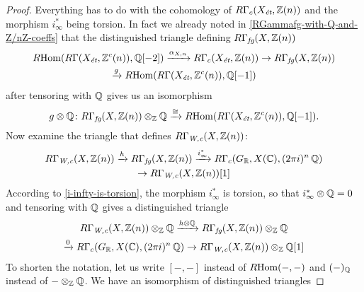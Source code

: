 \begin{proposition}
  \begin{proof}
    Everything has to do with the cohomology of
    $R\Gamma_c (X_\text{\it ét}, \mathbb{Z} (n))$ and the morphism $i_\infty^*$ being
    torsion. In fact we already noted in \ref{RGammafg-with-Q-and-Z/nZ-coeffs}
    that the distinguished triangle defining
    $R\Gamma_\text{\it fg} (X, \mathbb{Z} (n))$
    \begin{multline*}
      R\!\operatorname{Hom} (R\Gamma (X_\text{\it ét}, \mathbb{Z}^c (n)), \mathbb{Q} [-2])
      \xrightarrow{\alpha_{X,n}} R\Gamma_c (X_\text{\it ét}, \mathbb{Z} (n)) \to
      R\Gamma_\text{\it fg} (X, \mathbb{Z} (n)) \\
      \xrightarrow{g} R\!\operatorname{Hom} (R\Gamma (X_\text{\it ét}, \mathbb{Z}^c (n)), \mathbb{Q} [-1])
    \end{multline*}
    after tensoring with $\mathbb{Q}$ gives us an isomorphism
    \[ g\otimes\mathbb{Q}\colon
      R\Gamma_\text{\it fg} (X, \mathbb{Z} (n))\otimes_{\mathbb{Z}}\mathbb{Q} \xrightarrow{\cong}
      R\!\operatorname{Hom} (R\Gamma (X_\text{\it ét}, \mathbb{Z}^c (n)), \mathbb{Q} [-1]).\]
    Now examine the triangle that defines $R\Gamma_\text{\it W,c} (X, \mathbb{Z} (n))$:
    \begin{multline*}
      R\Gamma_\text{\it W,c} (X, \mathbb{Z} (n)) \xrightarrow{h}
      R\Gamma_\text{\it fg} (X, \mathbb{Z} (n)) \xrightarrow{i_\infty^*}
      R\Gamma_c (G_{\mathbb{R}}, X (\mathbb{C}), (2\pi i)^n\,\mathbb{Q}) \\
      \to R\Gamma_\text{\it W,c} (X, \mathbb{Z} (n)) [1]
    \end{multline*}
    According to \ref{i-infty-is-torsion}, the morphism $i_\infty^*$ is torsion,
    so that $i_\infty^*\otimes \mathbb{Q} = 0$ and tensoring with $\mathbb{Q}$ gives a
    distinguished triangle
    \begin{multline*}
      R\Gamma_\text{\it W,c} (X, \mathbb{Z} (n))\otimes_{\mathbb{Z}}\mathbb{Q}
      \xrightarrow{h\otimes\mathbb{Q}}
      R\Gamma_\text{\it fg} (X, \mathbb{Z} (n))\otimes_{\mathbb{Z}}\mathbb{Q} \\
      \xrightarrow{0} R\Gamma_c (G_{\mathbb{R}}, X (\mathbb{C}), (2\pi i)^n\,\mathbb{Q}) \to
      R\Gamma_\text{\it W,c} (X, \mathbb{Z} (n))\otimes_{\mathbb{Z}}\mathbb{Q} [1]
    \end{multline*}
    To shorten the notation, let us write $[-, -]$ instead of $R\!\operatorname{Hom} (-, -)$ and
    $(-)_{\mathbb{Q}}$ instead of $-\otimes_{\mathbb{Z}} \mathbb{Q}$. We have an isomorphism of
    distinguished triangles


\end{proof}
\end{proposition}
